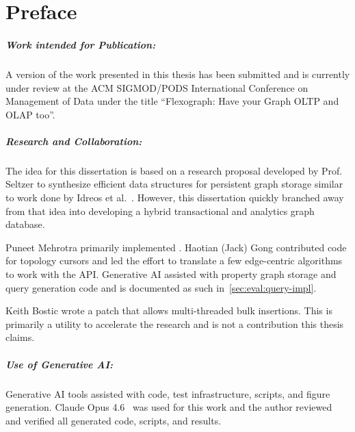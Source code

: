 \chapter{Preface}


\paragraph{Work intended for Publication:} A version of the work presented in this thesis has been submitted and is currently under review at the ACM SIGMOD/PODS International Conference on Management of Data under the title “Flexograph: Have your Graph OLTP and OLAP too”.

\paragraph{Research and Collaboration:} The idea for this dissertation is based on a research proposal developed by Prof. Seltzer to synthesize efficient data structures for persistent graph storage similar to work done by Idreos et al.~\cite{dataCalculator-StratosIdreos}.
However, this dissertation quickly branched away from that idea into developing a hybrid transactional and analytics graph database.

Puneet Mehrotra primarily implemented \project{}.
Haotian (Jack) Gong contributed code for topology cursors and led the effort to translate a few edge-centric algorithms to work with the \project{} API.
Generative AI assisted with property graph storage and query generation code and is documented as such in~\autoref{sec:eval:query-impl}.

Keith Bostic wrote a \wt{} patch that allows multi-threaded bulk insertions.
This is primarily a utility to accelerate the research and is not a contribution this thesis claims.

\paragraph{Use of Generative AI:} Generative AI tools assisted with code, test infrastructure, scripts, and figure generation.
Claude Opus 4.6~\cite{anthropic2026claudecodedocs} was used for this work and the author reviewed and verified all generated code, scripts, and results.